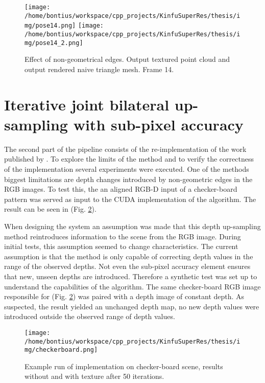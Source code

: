 \documentclass{ucl_thesis}
\newcommand{\figref}[1]{(Fig. \ref{#1})}
\begin{document}
\begin{figure}[h!]\centering
    \texttt{[image: /home/bontius/workspace/cpp\_projects/KinfuSuperRes/thesis/img/pose14.png]}
    \texttt{[image: /home/bontius/workspace/cpp\_projects/KinfuSuperRes/thesis/img/pose14\_2.png]}
    \caption{Effect of non-geometrical edges. Output textured point cloud and output rendered naive triangle mesh. Frame 14.}
    \label{fig:pose14}
\end{figure}

\section{Iterative joint bilateral up-sampling with sub-pixel accuracy}
\label{sec:yang}

\par The second part of the pipeline consists of the re-implementation of the work published by \citep{cvpr-07-qingxiong-yang}. To explore the limits of the method and to verify the correctness of the implementation several experiments were executed. One of the methods biggest limitations are depth changes introduced by non-geometric edges in the RGB images. To test this, the an aligned RGB-D input of a checker-board pattern was served as input to the CUDA implementation of the algorithm. The result can be seen in \figref{fig:yang_checkerboard}. 
\par When designing the system an assumption was made that this depth up-sampling method reintroduces information to the scene from the RGB image. During initial tests, this assumption seemed to change characteristics. The current assumption is that the method is only capable of correcting depth values in the range of the observed depths. Not even the sub-pixel accuracy element ensures that new, unseen depths are introduced. Therefore a synthetic test was set up to understand the capabilities of the algorithm. The same checker-board RGB image responsible for \figref{fig:yang_checkerboard} was paired with a depth image of constant depth. As suspected, the result yielded an unchanged depth map, no new depth values were introduced outside the observed range of depth values.

\begin{figure}[h!]\centering 
        \texttt{[image: /home/bontius/workspace/cpp\_projects/KinfuSuperRes/thesis/img/checkerboard.png]}        
        \caption{Example run of implementation on checker-board scene, results without and with texture after 50 iterations.}
        \label{fig:yang_checkerboard}
\end{figure}
\end{document}
